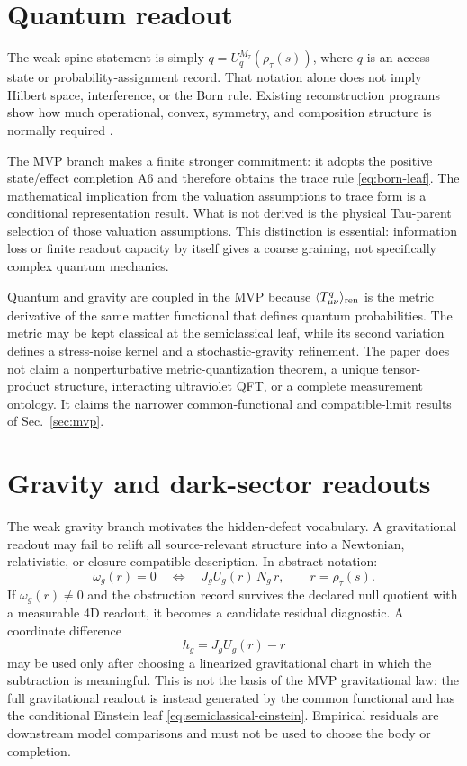 \documentclass[11pt]{article}
\newcommand{\Rmap}{\rho_{\tau}}
\newcommand{\Mta}{M_{\tau}}
\begin{document}
\section{Quantum readout}

The weak-spine statement is simply
\(q=U_q^{\Mta}(\Rmap(s))\), where \(q\) is an access-state or
probability-assignment record.  That notation alone does not imply Hilbert
space, interference, or the Born rule.  Existing reconstruction programs show
how much operational, convex, symmetry, and composition structure is normally
required \cite{Hardy2001,Chiribella2011,MasanesMueller2011,BarnumWilce2014}.

The MVP branch makes a finite stronger commitment: it adopts the positive
state/effect completion A6 and therefore obtains the trace rule
\eqref{eq:born-leaf}.  The mathematical implication from the valuation
assumptions to trace form is a conditional representation result.  What is not
derived is the physical Tau-parent selection of those valuation assumptions.
This distinction is essential: information loss or finite readout capacity by
itself gives a coarse graining, not specifically complex quantum mechanics.

Quantum and gravity are coupled in the MVP because
\(\langle T_{\mu\nu}^{q}\rangle_{\rm ren}\) is the metric derivative of the
same matter functional that defines quantum probabilities.  The metric may be
kept classical at the semiclassical leaf, while its second variation defines a
stress-noise kernel and a stochastic-gravity refinement.  The paper does not
claim a nonperturbative metric-quantization theorem, a unique tensor-product
structure, interacting ultraviolet QFT, or a complete measurement ontology.
It claims the narrower common-functional and compatible-limit results of
Sec.~\ref{sec:mvp}.

\section{Gravity and dark-sector readouts}

The weak gravity branch motivates the hidden-defect vocabulary.  A
gravitational readout may fail to relift all source-relevant structure into a
Newtonian, relativistic, or closure-compatible description.  In abstract
notation:
\begin{equation}
  \omega_g(r)=0
  \quad\Longleftrightarrow\quad
  J_gU_g(r)\,N_g\,r,
  \qquad r=\Rmap(s).
\end{equation}
If \(\omega_g(r)\neq0\) and the obstruction record survives the declared null
quotient with a measurable 4D readout, it becomes a candidate residual
diagnostic.  A coordinate difference
\[
  h_g=J_gU_g(r)-r
\]
may be used only after choosing a linearized gravitational chart in which the
subtraction is meaningful.  This is not the basis of the MVP gravitational
law: the full gravitational readout is instead generated by the common
functional and has the conditional Einstein leaf
\eqref{eq:semiclassical-einstein}.  Empirical residuals are downstream model
comparisons and must not be used to choose the body or completion.
\end{document}
